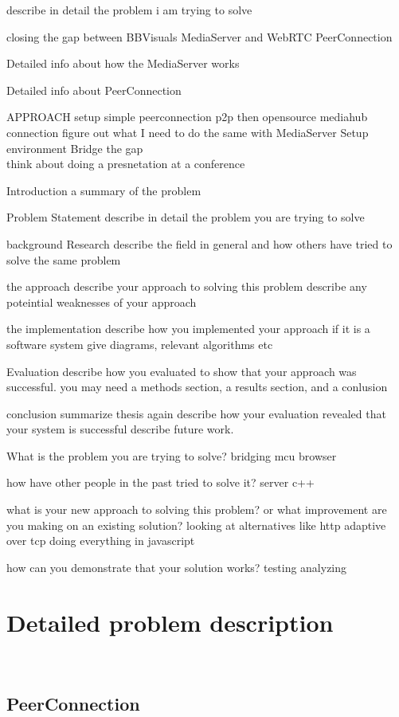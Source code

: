 
describe in detail the problem i am trying to solve

closing the gap between BBVisuals MediaServer and WebRTC PeerConnection

Detailed info about how the MediaServer works

Detailed info about PeerConnection

APPROACH
setup simple peerconnection p2p
then opensource mediahub connection
figure out what I need to do the same with MediaServer
Setup environment
Bridge the gap
\\
think about doing a presnetation at a conference

Introduction
a summary of the problem

Problem Statement
describe in detail the problem you are trying to solve

background Research
describe the field in general
and how others have tried to solve the same problem

the approach
describe your approach to solving this problem
describe any poteintial weaknesses of your approach

the implementation
describe how you implemented your approach
if it is a software system give diagrams, relevant algorithms etc

Evaluation
describe how you evaluated to show that your approach was successful.
you may need a methods section, a results section, and a conlusion

conclusion
summarize thesis again
describe how your evaluation revealed that your system is successful
describe future work.

What is the problem you are trying to solve?
bridging mcu browser

how have other people in the past tried to solve it?
server c++

what is your new approach to solving this problem? or what improvement are you making on an existing solution?
looking at alternatives like http adaptive over tcp
doing everything in javascript

how can you demonstrate that your solution works?
testing analyzing


\section{Detailed problem description}
\\

\subsection{PeerConnection}
